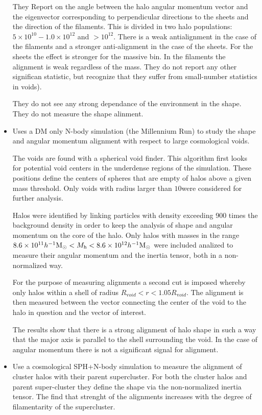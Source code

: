 \documentclass[usenatbib]{mn2e}
\newcommand{\hMpc}{{\ifmmode{h^{-1}{\rm Mpc}}\else{$h^{-1}$Mpc }\fi}}
\newcommand{\hMsun}{{\ifmmode{h^{-1}{\rm
        {M_{\odot}}}}\else{$h^{-1}{\rm{M_{\odot}}}$}\fi}}
\begin{document}
\begin{itemize}
They Report on the angle between the halo
angular momentum vector and the eigenvector corresponding to
perpendicular directions to the sheets and the direction of the
filaments. This is divided in two halo populations: $5\times 10^{10} -
1.0\times 10^{12}$ and $>10^{12}$. There is a weak antialignment in
the case of the filaments and a stronger anti-alignment in the case of
the sheets. For the sheets the effect is stronger for the massive
bin. In the filaments the alignment is weak regardless of the
mass. They do not report any other significan statistic, but recognize
that they suffer from small-number statistics in voids).


They do not see any strong dependance of the environment in the
shape. They do not measure the shape alinment.

\item
\citep{Brunino2007}
Uses a DM only N-body simulation (the Millennium Run) to study the
shape and angular momentum alignment with respect to large
cosmological voids. 

The voids are found with a spherical void finder. This algorithm first
looks for potential void centers in the underdense regions of the
simulation. These positions define the centers of spheres that are
empty of halos above a given mass threshold. Only voids with radius
larger than $10$\hMpc were considered for further analysis.

Halos were identified by linking particles with density exceeding 900
times the background density in order to keep the analysis of shape
and angular momentum on the core of the halo. Only halos with masses
in the range $8.6\times 10^{11}\hMsun < M_{\mathrm h}< 8.6\times
10^{12}\hMsun$ were included analized to measure their angular
momentum and the inertia tensor, both in a non-normalized way.

For the purpose of measuring alignments a second cut is imposed
whereby only halos within a shell of radius $R_{\mathrm void}<r<1.05R_{\mathrm
void}$. The alignment is then measured between the vector connecting
the center of the void to the halo in question and the vector of
interest.

The results show that there is a strong alignment of halo shape in
such a way that the major axis is parallel to the shell surrounding
the void. In the case of angular momentum there is not a significant
signal for alignment.




\item
\citep{Basilakos2006}
Use a cosmological SPH+N-body simulation to measure the alignment of
cluster halos with their parent supercluster. For both the cluster
halos and parent super-cluster they define the shape via the
non-normalized inertia tensor.  The find that strenght of the
alignments increases with the degree of filamentarity of the
supercluster.


\end{itemize}
\end{document}
